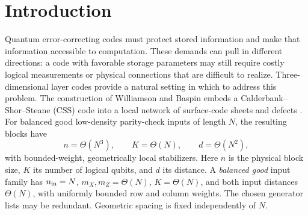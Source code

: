 \begin{abstract}
Three-dimensional layer codes combine local stabilizer checks with favorable
storage parameters. We specify a realization of the Williamson--Baspin
construction for Calderbank--Shor--Steane (CSS) inputs with check weights at
least two and prove that it preserves the encoded dimension. Every pure-$X$
logical class is accessible in each lattice layer, and every pure-$Z$ class
in each transverse plane. For balanced good inputs of length $N$, these
slabs give the optimal distance scaling $\Theta(N^2)$. A three-dimensional
gauging grid with constant edge multiplicity preserves static code distance.
For the same gauging construction, a bounded-thickness bridge between two
blocks instead admits a short logical cut. Finite simulations support this
contrast at low noise; separate routed circuits exhibit bridge fault distance
one on three inputs and recover the tested idle-memory distances on the
smallest blocks with a spanning grid. We give local gate and deterministic
resource-distillation constructions and derive space and depth bounds for a
universal architecture, conditional on stated uniform detector, composition,
and resource-locality hypotheses under local-stochastic Pauli noise.

\end{abstract}
\maketitle
\raggedbottom

\section{Introduction}
Quantum error-correcting codes must protect stored information and make that
information accessible to computation. These demands can pull in different
directions: a code with favorable storage parameters may still require costly
logical measurements or physical connections that are difficult to realize.
Three-dimensional layer codes provide a natural setting in which to address
this problem. The construction of Williamson and Baspin embeds a Calderbank--Shor--Steane (CSS) code into
a local network of surface-code sheets and defects \cite{WilliamsonBaspinLayerCodes}.
For balanced good low-density parity-check inputs of length $N$, the resulting
blocks have
\begin{equation}
 n=\Theta(N^3),\qquad K=\Theta(N),\qquad d=\Theta(N^2),
 \label{eq:parameters}
\end{equation}
with bounded-weight, geometrically local stabilizers. Here $n$ is the physical
block size, $K$ its number of logical qubits, and $d$ its distance. A
\emph{balanced good} input family has $n_{\rm in}=N$,
$m_X,m_Z=\Theta(N)$, $K=\Theta(N)$, and both input distances
$\Theta(N)$, with uniformly bounded row and column weights. The chosen
generator lists may be redundant. Geometric spacing is fixed independently
of $N$.

